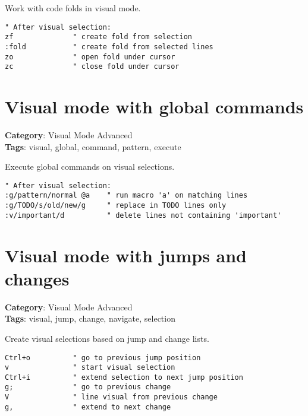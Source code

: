 {{{{{{{{{{{{{{{{{{{Work with code folds in visual mode.

\begin{Exa*}{}
\begin{Verbatim}[fontsize=\footnotesize, breaklines, breakanywhere]
" After visual selection:
zf              " create fold from selection
:fold           " create fold from selected lines
zo              " open fold under cursor
zc              " close fold under cursor
\end{Verbatim}
\end{Exa*}

\section{Visual mode with global commands}

\textbf{Category}: Visual Mode Advanced\\ \textbf{Tags}: visual, global, command, pattern, execute
\vspace{0.5cm}

Execute global commands on visual selections.

\begin{Exa*}{}
\begin{Verbatim}[fontsize=\footnotesize, breaklines, breakanywhere]
" After visual selection:
:g/pattern/normal @a    " run macro 'a' on matching lines
:g/TODO/s/old/new/g     " replace in TODO lines only
:v/important/d          " delete lines not containing 'important'
\end{Verbatim}
\end{Exa*}

\section{Visual mode with jumps and changes}

\textbf{Category}: Visual Mode Advanced\\ \textbf{Tags}: visual, jump, change, navigate, selection
\vspace{0.5cm}

Create visual selections based on jump and change lists.

\begin{Exa*}{}
\begin{Verbatim}[fontsize=\footnotesize, breaklines, breakanywhere]
Ctrl+o          " go to previous jump position
v               " start visual selection  
Ctrl+i          " extend selection to next jump position
g;              " go to previous change
V               " line visual from previous change  
g,              " extend to next change
\end{Verbatim}
\end{Exa*}

}}}}}}}}}}}}}}}}}}}
